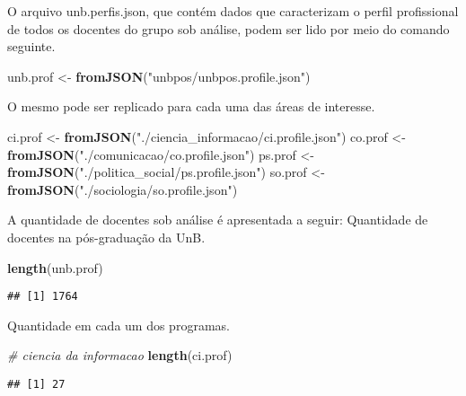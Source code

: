\documentclass[]{article}
\newenvironment{Shaded}{\begin{snugshade}}{\end{snugshade}}
\newcommand{\KeywordTok}[1]{\textcolor[rgb]{0.13,0.29,0.53}{\textbf{#1}}}
\newcommand{\StringTok}[1]{\textcolor[rgb]{0.31,0.60,0.02}{#1}}
\newcommand{\CommentTok}[1]{\textcolor[rgb]{0.56,0.35,0.01}{\textit{#1}}}
\newcommand{\NormalTok}[1]{#1}
\begin{document}
O arquivo unb.perfis.json, que contém dados que caracterizam o perfil
profissional de todos os docentes do grupo sob análise, podem ser lido
por meio do comando seguinte.

\begin{Shaded}
\begin{Highlighting}[]
\NormalTok{unb.prof <-}\StringTok{ }\KeywordTok{fromJSON}\NormalTok{(}\StringTok{"unbpos/unbpos.profile.json"}\NormalTok{)}
\end{Highlighting}
\end{Shaded}

O mesmo pode ser replicado para cada uma das áreas de interesse.

\begin{Shaded}
\begin{Highlighting}[]
\NormalTok{ci.prof <-}\StringTok{ }\KeywordTok{fromJSON}\NormalTok{(}\StringTok{"./ciencia_informacao/ci.profile.json"}\NormalTok{)}
\NormalTok{co.prof <-}\StringTok{ }\KeywordTok{fromJSON}\NormalTok{(}\StringTok{"./comunicacao/co.profile.json"}\NormalTok{)}
\NormalTok{ps.prof <-}\StringTok{ }\KeywordTok{fromJSON}\NormalTok{(}\StringTok{"./politica_social/ps.profile.json"}\NormalTok{)}
\NormalTok{so.prof <-}\StringTok{ }\KeywordTok{fromJSON}\NormalTok{(}\StringTok{"./sociologia/so.profile.json"}\NormalTok{)}
\end{Highlighting}
\end{Shaded}

A quantidade de docentes sob análise é apresentada a seguir: Quantidade
de docentes na pós-graduação da UnB.

\begin{Shaded}
\begin{Highlighting}[]
\KeywordTok{length}\NormalTok{(unb.prof)}
\end{Highlighting}
\end{Shaded}

\begin{verbatim}
## [1] 1764
\end{verbatim}

Quantidade em cada um dos programas.

\begin{Shaded}
\begin{Highlighting}[]
\CommentTok{# ciencia da informacao}
\KeywordTok{length}\NormalTok{(ci.prof)}
\end{Highlighting}
\end{Shaded}

\begin{verbatim}
## [1] 27
\end{verbatim}
\end{document}

